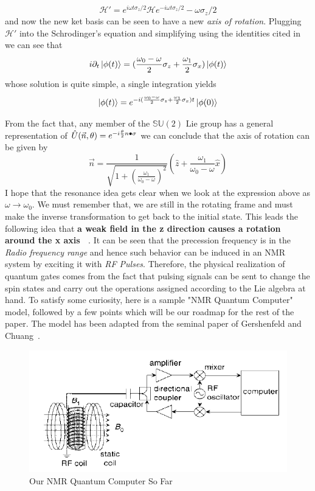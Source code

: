 \documentclass[12pt]{article}
\begin{document}
$$\mathcal{H'} = e^{i\omega t\sigma_z/2}\mathcal{H}e^{-i\omega t\sigma_z/2} - \omega\sigma_z/2$$ and now the new ket basis can be seen to have a new \textit{axis of rotation}. Plugging $\mathcal{H'}$ into the Schrodinger's equation and simplifying using the identities cited in ~\cite{ohio} we can see that $$i\partial_t \ket{\phi (t)} = (\frac{\omega_0 - \omega}{2}\sigma_z + \frac{\omega_1}{2}\sigma_x)\ket{\phi (t)}$$
whose solution is quite simple, a single integration yields
$$\ket{\phi (t)} = e^{-i(\frac{\omega_0 - \omega}{2}\sigma_z + \frac{\omega_1}{2}\sigma_x)t}\ket{\phi (0)}$$

From the fact that, any member of the $\mathbb{SU}(2)$ Lie group has a general representation of $\hat{U}(\vec{n}, \theta) = e^{-i\frac{\theta}{2}{n}\bullet{\sigma}}$ we can conclude that the axis of rotation can be given by 
$$\vec{n} = \frac{1}{\sqrt{1+(\frac{\omega_1}{\omega_0 - \omega})^2}}(\hat{z}+\frac{\omega_1}{\omega_0-\omega}\hat{x})$$
I hope that the resonance idea gets clear when we look at the expression above as $\omega \to \omega_0$. We must remember that, we are still in the rotating frame and must make the inverse transformation to get back to the initial state. This leads the following idea that \textbf{a weak field in the z direction causes a rotation around the x axis ~\cite{ethz}}. It can be seen that the precession frequency is in the \textit{Radio frequency range} and hence such behavior can be induced in an NMR system by exciting it with \textit{RF Pulses}. 
Therefore, the physical realization of quantum gates comes from the fact that pulsing signals can be sent to change the spin states and carry out the operations assigned according to the Lie algebra at hand. To satisfy some curiosity, here is a sample "NMR Quantum Computer" model, followed by a few points which will be our roadmap for the rest of the paper. The model has been adapted from the seminal paper of Gershenfeld and Chuang~\cite{gnc}.
\begin{center}
\begin{figure}
\includegraphics[scale=0.8]{gnc.png}
\caption{Our NMR Quantum Computer So Far}
\end{figure}
\end{center}
\end{document}
